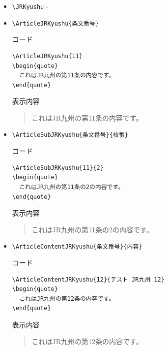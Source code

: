 \documentclass[oneside,10pt,a4paper]{jsarticle}
\begin{document}
  \begin{itemize}
    \item \verb|\JRKyushu| - \JRKyushu
    \item \verb|\ArticleJRKyushu{条文番号}|
      \begin{itembox}[l]{コード}
        \begin{verbatim}
\ArticleJRKyushu{11}
\begin{quote}
  これはJR九州の第11条の内容です。
\end{quote}\end{verbatim}
      \end{itembox}
      \begin{itembox}[l]{表示内容}
        \begin{quote}
          これはJR九州の第11条の内容です。
        \end{quote}
      \end{itembox}
    \item \verb|\ArticleSubJRKyushu{条文番号}{枝番}|
      \begin{itembox}[l]{コード}
        \begin{verbatim}
\ArticleSubJRKyushu{11}{2}
\begin{quote}
  これはJR九州の第11条の2の内容です。
\end{quote}\end{verbatim}
      \end{itembox}
      \begin{itembox}[l]{表示内容}
        \begin{quote}
          これはJR九州の第11条の2の内容です。
        \end{quote}
      \end{itembox}
    \newpage
    \item \verb|\ArticleContentJRKyushu{条文番号}{内容}|
      \begin{itembox}[l]{コード}
        \begin{verbatim}
\ArticleContentJRKyushu{12}{テスト JR九州 12}
\begin{quote}
  これはJR九州の第12条の内容です。
\end{quote}\end{verbatim}
      \end{itembox}
      \begin{itembox}[l]{表示内容}
        \begin{quote}
          これはJR九州の第12条の内容です。

\end{quote}
\end{itembox}
\end{itemize}
\end{document}
